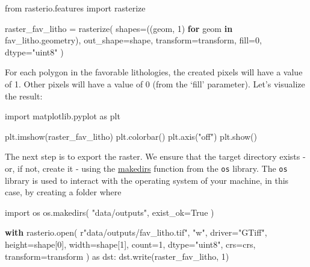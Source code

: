 \documentclass[
  letterpaper,
  DIV=11,
  numbers=noendperiod]{scrartcl}
\newenvironment{Shaded}{\begin{snugshade}}{\end{snugshade}}
\newcommand{\BuiltInTok}[1]{\textcolor[rgb]{0.00,0.23,0.31}{#1}}
\newcommand{\ControlFlowTok}[1]{\textcolor[rgb]{0.00,0.23,0.31}{\textbf{#1}}}
\newcommand{\DecValTok}[1]{\textcolor[rgb]{0.68,0.00,0.00}{#1}}
\newcommand{\ImportTok}[1]{\textcolor[rgb]{0.00,0.46,0.62}{#1}}
\newcommand{\KeywordTok}[1]{\textcolor[rgb]{0.00,0.23,0.31}{\textbf{#1}}}
\newcommand{\NormalTok}[1]{\textcolor[rgb]{0.00,0.23,0.31}{#1}}
\newcommand{\OperatorTok}[1]{\textcolor[rgb]{0.37,0.37,0.37}{#1}}
\newcommand{\StringTok}[1]{\textcolor[rgb]{0.13,0.47,0.30}{#1}}
\newcommand{\VariableTok}[1]{\textcolor[rgb]{0.07,0.07,0.07}{#1}}
\newcommand{\VerbatimStringTok}[1]{\textcolor[rgb]{0.13,0.47,0.30}{#1}}
\begin{document}
\begin{Shaded}
\begin{Highlighting}[]
\ImportTok{from}\NormalTok{ rasterio.features }\ImportTok{import}\NormalTok{ rasterize}

\NormalTok{raster\_fav\_litho }\OperatorTok{=}\NormalTok{ rasterize(}
\NormalTok{    shapes}\OperatorTok{=}\NormalTok{((geom, }\DecValTok{1}\NormalTok{) }\ControlFlowTok{for}\NormalTok{ geom }\KeywordTok{in}\NormalTok{ fav\_litho.geometry),}
\NormalTok{    out\_shape}\OperatorTok{=}\NormalTok{shape,}
\NormalTok{    transform}\OperatorTok{=}\NormalTok{transform,}
\NormalTok{    fill}\OperatorTok{=}\DecValTok{0}\NormalTok{,}
\NormalTok{    dtype}\OperatorTok{=}\StringTok{"uint8"}
\NormalTok{)}
\end{Highlighting}
\end{Shaded}

For each polygon in the favorable lithologies, the created pixels will
have a value of 1. Other pixels will have a value of 0 (from the `fill'
parameter). Let's visualize the result:

\begin{Shaded}
\begin{Highlighting}[]
\ImportTok{import}\NormalTok{ matplotlib.pyplot }\ImportTok{as}\NormalTok{ plt}

\NormalTok{plt.imshow(raster\_fav\_litho)}
\NormalTok{plt.colorbar()}
\NormalTok{plt.axis(}\StringTok{"off"}\NormalTok{)}
\NormalTok{plt.show()}
\end{Highlighting}
\end{Shaded}

The next step is to export the raster. We ensure that the target
directory exists - or, if not, create it - using the
\href{https://docs.python.org/3/library/os.html\#os.makedirs}{makedirs}
function from the \texttt{os} library. The \texttt{os} library is used
to interact with the operating system of your machine, in this case, by
creating a folder where

\begin{Shaded}
\begin{Highlighting}[]
\ImportTok{import}\NormalTok{ os}
\NormalTok{os.makedirs(}
    \StringTok{"data/outputs"}\NormalTok{,}
\NormalTok{    exist\_ok}\OperatorTok{=}\VariableTok{True}
\NormalTok{)}

\ControlFlowTok{with}\NormalTok{ rasterio.}\BuiltInTok{open}\NormalTok{(}
    \VerbatimStringTok{r"data/outputs/fav\_litho}\DecValTok{.}\VerbatimStringTok{tif"}\NormalTok{, }\StringTok{"w"}\NormalTok{,}
\NormalTok{    driver}\OperatorTok{=}\StringTok{"GTiff"}\NormalTok{,}
\NormalTok{    height}\OperatorTok{=}\NormalTok{shape[}\DecValTok{0}\NormalTok{], width}\OperatorTok{=}\NormalTok{shape[}\DecValTok{1}\NormalTok{],}
\NormalTok{    count}\OperatorTok{=}\DecValTok{1}\NormalTok{, dtype}\OperatorTok{=}\StringTok{"uint8"}\NormalTok{,}
\NormalTok{    crs}\OperatorTok{=}\NormalTok{crs, transform}\OperatorTok{=}\NormalTok{transform}
\NormalTok{) }\ImportTok{as}\NormalTok{ dst:}
\NormalTok{    dst.write(raster\_fav\_litho, }\DecValTok{1}\NormalTok{)}
\end{Highlighting}
\end{Shaded}
\end{document}
